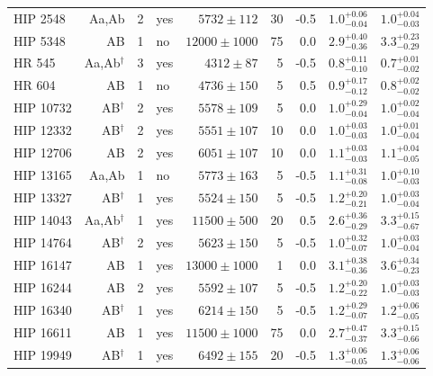 {\begin{scriptsize}
\begin{longtable}{|l|rrlrrrll|}
   HIP 2548 & Aa,Ab &     2 & yes &  $5732 \pm 112$ &      30 &    -0.5  &  $1.0^{+0.06}_{-0.04}$ &  $1.0^{+0.04}_{-0.03}$ \\
   HIP 5348 & AB &     1 & no &  $12000 \pm 1000$ &     75 &     0.0 &  $2.9^{+0.40}_{-0.36}$ &  $3.3^{+0.23}_{-0.29}$ \\
     HR 545 & Aa,Ab$^{\dagger}$ &     3 & yes &   $4312 \pm 87$ &       5 &    -0.5  &  $0.8^{+0.11}_{-0.10}$ &  $0.7^{+0.01}_{-0.02}$ \\
     HR 604 & AB &     1 & no &  $4736 \pm 150$ &       5 &     0.5  &    $0.9^{+0.17}_{-0.12}$ &  $0.8^{+0.02}_{-0.02}$ \\
  HIP 10732 & AB$^{\dagger}$ &     2 & yes &  $5578 \pm 109$ &       5 &     0.0  &  $1.0^{+0.29}_{-0.04}$ &  $1.0^{+0.02}_{-0.04}$ \\
  HIP 12332 & AB$^{\dagger}$ &     2 & yes &  $5551 \pm 107$ &      10 &     0.0  &    $1.0^{+0.03}_{-0.03}$ &  $1.0^{+0.01}_{-0.04}$ \\
  HIP 12706 & AB &     2 & yes &  $6051 \pm 107$ &      10 &     0.0  &  $1.1^{+0.03}_{-0.03}$ &  $1.1^{+0.04}_{-0.05}$ \\
  HIP 13165 & Aa,Ab &     1 & no &  $5773 \pm 163$ &       5 &    -0.5  &  $1.1^{+0.31}_{-0.08}$ &  $1.0^{+0.10}_{-0.03}$ \\
  HIP 13327 & AB$^{\dagger}$ &     1 & yes &  $5524 \pm 150$ &       5 &    -0.5  &  $1.2^{+0.20}_{-0.21}$ &  $1.0^{+0.03}_{-0.04}$ \\
  HIP 14043 & Aa,Ab$^{\dagger}$ &     1 & yes &  $11500 \pm 500$ &       20 &    0.5  &  $2.6^{+0.36}_{-0.29}$ &  $3.3^{+0.15}_{-0.67}$ \\
  HIP 14764 & AB$^{\dagger}$ &     2 & yes &  $5623 \pm 150$ &      5 &     -0.5 &    $1.0^{+0.32}_{-0.07}$ &  $1.0^{+0.03}_{-0.04}$ \\
  HIP 16147 & AB &     1 & yes &  $13000 \pm 1000$ &      1 &     0.0 &  $3.1^{+0.38}_{-0.36}$ &  $3.6^{+0.34}_{-0.23}$ \\
  HIP 16244 & AB &     2 & yes &  $5592 \pm 107$ &       5 &    -0.5  &  $1.2^{+0.20}_{-0.22}$ &  $1.0^{+0.03}_{-0.03}$ \\
  HIP 16340 & AB$^{\dagger}$ &     1 & yes &  $6214 \pm 150$ &       5 &    -0.5  &  $1.2^{+0.29}_{-0.07}$ &  $1.2^{+0.06}_{-0.05}$ \\
  HIP 16611 & AB &     1 & yes &  $11500 \pm 1000$ &     75 &     0.0 &  $2.7^{+0.47}_{-0.37}$ &  $3.3^{+0.15}_{-0.66}$ \\
  HIP 19949 & AB$^{\dagger}$ &     1 & yes &  $6492 \pm 155$ &      20 &    -0.5  &  $1.3^{+0.06}_{-0.05}$ &  $1.3^{+0.06}_{-0.06}$ \\

\end{longtable}
\end{scriptsize}}
